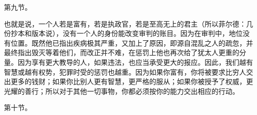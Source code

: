 第九节。 \par

也就是说，一个人若是富有，若是执政官，若是至高无上的君主（所以菲尔德：几份抄本和版本说），没有一个人的身份能改变审判的账目。因为在审判中，地位没有位置。既然他已指出疾病极其严重，又加上了原因，即源自混乱之人的疏忽，并最终指出毁灭等着他们，而改正并不难，在惩罚上他也再次给了犹太人更重的分量。因为享有更大教导的人，如果违法，也应当承受更大的报应。因此，我们越有智慧或越有权势，犯罪时受的惩罚也越重。因为如果你富有，你将被要求比穷人交出更多的钱财；如果你比别人更有智慧，更严格的服从；如果你被授予了权威，更光耀的善行；所以对于其他一切事物，你都必须按你的能力交出相应的行动。\par

第十节。 \par

